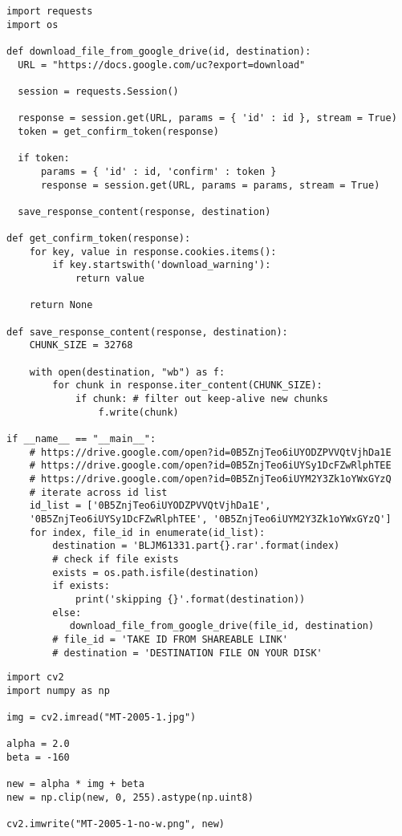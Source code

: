 \begin{lstlisting}[caption={Python Script to download from google drive}]
import requests
import os

def download_file_from_google_drive(id, destination):
  URL = "https://docs.google.com/uc?export=download"

  session = requests.Session()

  response = session.get(URL, params = { 'id' : id }, stream = True)
  token = get_confirm_token(response)

  if token:
      params = { 'id' : id, 'confirm' : token }
      response = session.get(URL, params = params, stream = True)

  save_response_content(response, destination)    

def get_confirm_token(response):
    for key, value in response.cookies.items():
        if key.startswith('download_warning'):
            return value

    return None

def save_response_content(response, destination):
    CHUNK_SIZE = 32768

    with open(destination, "wb") as f:
        for chunk in response.iter_content(CHUNK_SIZE):
            if chunk: # filter out keep-alive new chunks
                f.write(chunk)

if __name__ == "__main__":
    # https://drive.google.com/open?id=0B5ZnjTeo6iUYODZPVVQtVjhDa1E
    # https://drive.google.com/open?id=0B5ZnjTeo6iUYSy1DcFZwRlphTEE
    # https://drive.google.com/open?id=0B5ZnjTeo6iUYM2Y3Zk1oYWxGYzQ
    # iterate across id list 
    id_list = ['0B5ZnjTeo6iUYODZPVVQtVjhDa1E',
    '0B5ZnjTeo6iUYSy1DcFZwRlphTEE', '0B5ZnjTeo6iUYM2Y3Zk1oYWxGYzQ']
    for index, file_id in enumerate(id_list):
        destination = 'BLJM61331.part{}.rar'.format(index)
        # check if file exists
        exists = os.path.isfile(destination)
        if exists:
            print('skipping {}'.format(destination))
        else:
           download_file_from_google_drive(file_id, destination)
        # file_id = 'TAKE ID FROM SHAREABLE LINK'
        # destination = 'DESTINATION FILE ON YOUR DISK'
\end{lstlisting}

\begin{lstlisting}[caption={Python Script to remove watermark}]
import cv2
import numpy as np

img = cv2.imread("MT-2005-1.jpg")

alpha = 2.0
beta = -160

new = alpha * img + beta
new = np.clip(new, 0, 255).astype(np.uint8)

cv2.imwrite("MT-2005-1-no-w.png", new)
\end{lstlisting}


